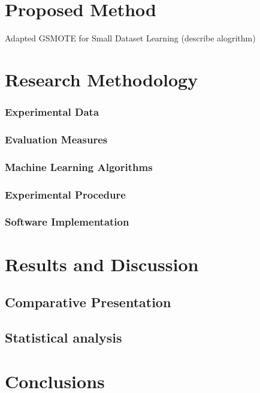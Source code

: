\documentclass[parskip=full]{scrartcl}
\begin{document}
\section{Proposed Method}

Adapted GSMOTE for Small Dataset Learning (describe alogrithm)

\section{Research Methodology}

\subsubsection{Experimental Data}
\subsubsection{Evaluation Measures}
\subsubsection{Machine Learning Algorithms}
\subsubsection{Experimental Procedure}
\subsubsection{Software Implementation}

\section{Results and Discussion}
\subsection{Comparative Presentation}
\subsection{Statistical analysis}

\section{Conclusions}



\end{document}
